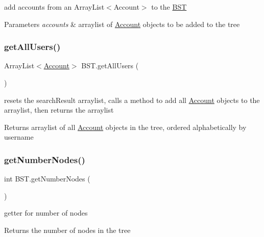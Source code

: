add accounts from an Array\+List$<$\+Account$>$ to the \hyperlink{class_b_s_t}{B\+ST} 


\begin{DoxyParams}{Parameters}
{\em accounts} & arraylist of \hyperlink{class_account}{Account} objects to be added to the tree \\
\hline
\end{DoxyParams}
\mbox{\label{class_b_s_t_a8c2f9ab541fcf9566854b84ee5e9c97c}} 
\subsubsection{\texorpdfstring{get\+All\+Users()}{getAllUsers()}}
{\footnotesize\ttfamily Array\+List$<$\hyperlink{class_account}{Account}$>$ B\+S\+T.\+get\+All\+Users (\begin{DoxyParamCaption}{ }\end{DoxyParamCaption})}



resets the search\+Result arraylist, calls a method to add all \hyperlink{class_account}{Account} objects to the arraylist, then returns the arraylist 

\begin{DoxyReturn}{Returns}
arraylist of all \hyperlink{class_account}{Account} objects in the tree, ordered alphabetically by username 
\end{DoxyReturn}
\mbox{\label{class_b_s_t_a7efc306d687afb24a2c79bdd15c2e1fd}} 
\subsubsection{\texorpdfstring{get\+Number\+Nodes()}{getNumberNodes()}}
{\footnotesize\ttfamily int B\+S\+T.\+get\+Number\+Nodes (\begin{DoxyParamCaption}{ }\end{DoxyParamCaption})}



getter for number of nodes 

\begin{DoxyReturn}{Returns}
the number of nodes in the tree 
\end{DoxyReturn}
\mbox{\label{class_b_s_t_a5d06adaf42f8e1d7f032a1b3be4cd813}} 

